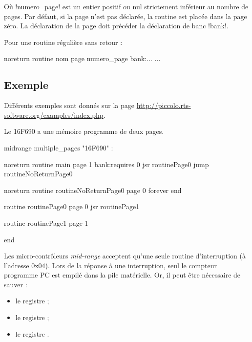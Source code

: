 Où \pic!numero_page! est un entier positif ou nul strictement inférieur au nombre de pages. Par défaut, si la page n'est pas déclarée, la routine est placée dans la page zéro. La déclaration de la page doit précéder la déclaration de banc \pic!bank!.

Pour une routine régulière sans retour :
\begin{piccolo}
  noreturn routine nom page numero_page bank:... {
    ...
  }
\end{piccolo}

\subsection{Exemple}

Différents exemples sont donnés sur la page \url{http://piccolo.rts-software.org/examples/index.php}.

Le 16F690 a une mémoire programme de deux pages. 

\begin{piccolo}
midrange multiple_pages "16F690" :

noreturn routine main page 1 bank:requires 0 {
  jsr  routinePage0
  jump routineNoReturnPage0
}

noreturn  routine routineNoReturnPage0 page 0 {
  forever
  end
}

routine routinePage0 page 0 {
  jsr  routinePage1
}

routine routinePage1 page 1 {
}

end
\end{piccolo}














Les micro-contrôleurs \emph{mid-range} acceptent qu’une seule routine d’interruption (à l’adresse 0x04). Lors de la réponse à une interruption, seul le compteur programme PC est empilé dans la pile matérielle. Or, il peut être nécessaire de sauver :
\begin{itemize}
  \item le registre  ;
  \item le registre  ;
  \item le registre .
\end{itemize}

